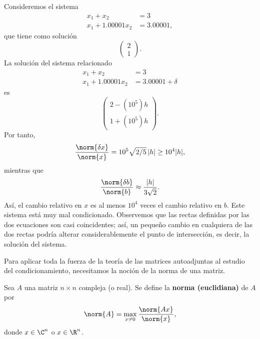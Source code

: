 \begin{ejemplo}
    Consideremos el sistema
    \begin{align*}
        x_1+x_2&=3\\
        x_1+1.00001x_2&=3.00001,
    \end{align*}
    que tiene como solución
    \begin{equation*}
        \begin{pmatrix}2\\1\end{pmatrix}.
    \end{equation*}
    La solución del sistema relacionado
    \begin{align*}
        x_1+x_2&=3\\
        x_1+1.00001x_2&=3.00001+\delta
    \end{align*}
    es
    \begin{equation*}
        \begin{pmatrix}2-(10^5)h\\1+(10^5)h\end{pmatrix}.
    \end{equation*}
    Por tanto,
    \begin{equation*}
        \frac{\norm{\delta x}}{\norm{x}}=10^5\sqrt{2/5}\,|h|\geq 10^4|h|,
    \end{equation*}
    mientras que
    \begin{equation*}
        \frac{\norm{\delta b}}{\norm{b}}\approx\frac{|h|}{3\sqrt2}.
    \end{equation*}
    Así, el cambio relativo en $x$ es al menos $10^4$ veces el cambio relativo en $b$. Este sistema está muy mal condicionado. Observemos que las rectas definidas por las dos ecuaciones son casi coincidentes; así, un pequeño cambio en cualquiera de las dos rectas podría alterar considerablemente el punto de intersección, es decir, la solución del sistema.
\end{ejemplo}

Para aplicar toda la fuerza de la teoría de las matrices autoadjuntas al estudio del condicionamiento, necesitamos la noción de la norma de una matriz.

\begin{definicion}
    Sea $A$ una matriz $n\times n$ compleja (o real). Se define la \textbf{norma (euclidiana)} de $A$ por
    \begin{equation*}
        \norm{A}=\max_{x\neq 0}\frac{\norm{Ax}}{\norm{x}},
    \end{equation*}
    donde $x\in\C^n$ o $x\in\R^n$.
\end{definicion}

